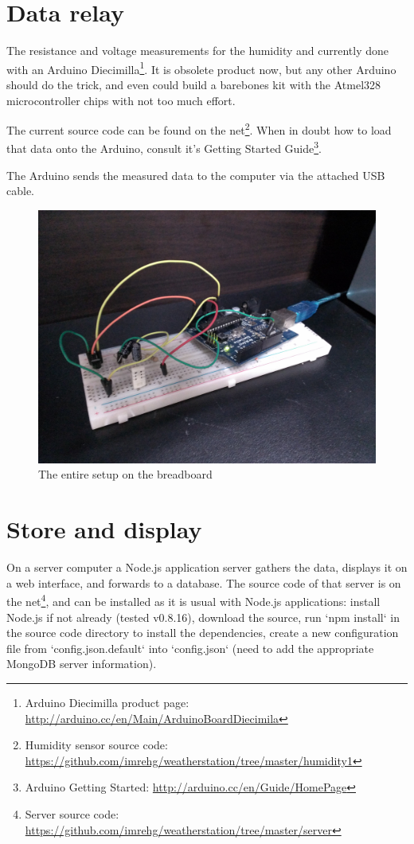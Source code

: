 \documentclass[12pt,a4paper]{article}
\begin{document}
\section{Data relay}

The resistance and voltage measurements for the humidity and currently done with an Arduino Diecimilla\footnote{Arduino Diecimilla product page: \url{http://arduino.cc/en/Main/ArduinoBoardDiecimila}}. It is obsolete product now, but any other Arduino should do the trick, and even could build a barebones kit with the Atmel328 microcontroller chips with not too much effort.

The current source code can be found on the net\footnote{Humidity sensor source code: \url{https://github.com/imrehg/weatherstation/tree/master/humidity1}}. When in doubt how to load that data onto the Arduino, consult it's Getting Started Guide\footnote{Arduino Getting Started: \url{http://arduino.cc/en/Guide/HomePage}}.

The Arduino sends the measured data to the computer via the attached USB cable.

\begin{figure}[ht!]
\centering
\includegraphics[width=140mm]{setup.jpg}
\caption{The entire setup on the breadboard}
\label{fig:setup}
\end{figure}

\section{Store and display}

On a server computer a Node.js application server gathers the data, displays it on a web interface, and forwards to a database. The source code of that server is on the net\footnote{Server source code: \url{https://github.com/imrehg/weatherstation/tree/master/server}}, and can be installed as it is usual with Node.js applications: install Node.js if not already (tested v0.8.16), download the source, run `npm install` in the source code directory to install the dependencies, create a new configuration file from `config.json.default` into `config.json` (need to add the appropriate MongoDB server information).
\end{document}
